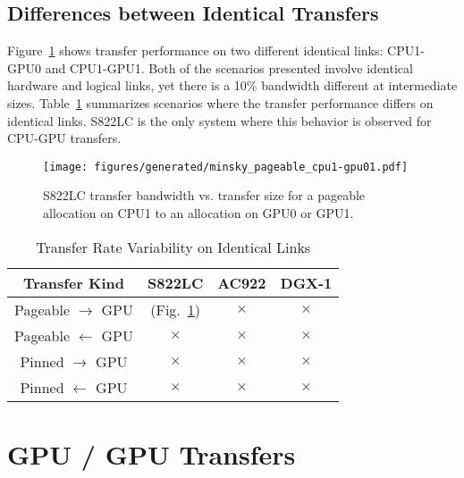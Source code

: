 \subsection{Differences between Identical Transfers}
\label{sec:explicit-cpu-gpu-identical}

Figure~\ref{fig:minsky_pageable_cpu1-gpu01} shows transfer performance on two different identical links: CPU1-GPU0 and CPU1-GPU1.
Both of the scenarios presented involve identical hardware and logical links, yet there is a 10\% bandwidth different at intermediate sizes.
Table~\ref{tab:explicit-identical} summarizes scenarios where the transfer performance differs on identical links.
S822LC is the only system where this behavior is observed for CPU-GPU transfers.

\begin{figure}[ht]
	\centering
	\texttt{[image: figures/generated/minsky\_pageable\_cpu1-gpu01.pdf]}
	\caption[Different Performance on Identical S822LC Links]{
        S822LC transfer bandwidth vs. transfer size for a pageable allocation on CPU1 to an allocation on GPU0 or GPU1.
	}
	\label{fig:minsky_pageable_cpu1-gpu01}
\end{figure}

\begin{table}[ht]
	\centering
	\caption[Transfer Rate Variability on Identical Links]{Transfer Rate Variability on Identical Links}
	\label{tab:explicit-identical}
	\begin{tabular}{cccc}
		\hline
		\textbf{Transfer Kind}     & \textbf{S822LC}                                        & \textbf{AC922} & \textbf{DGX-1} \\ \hline 
		Pageable $\rightarrow$ GPU & \checkmark (Fig.~\ref{fig:minsky_pageable_cpu1-gpu01}) & $\times$       & $\times$       \\ \hline
		Pageable $\leftarrow$ GPU  & $\times$                                               & $\times$       & $\times$       \\ \hline
		Pinned $\rightarrow$ GPU   & $\times$                                               & $\times$       & $\times$       \\ \hline
		Pinned $\leftarrow$ GPU    & $\times$                                               & $\times$       & $\times$       \\ \hline
	\end{tabular}
\end{table}

\section{GPU / GPU Transfers}
\label{sec:explicit-gpu-gpu}

